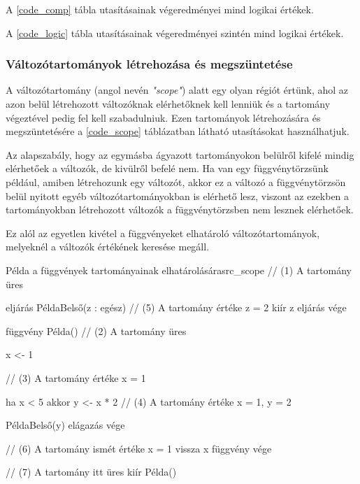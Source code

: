 A \ref{code_comp} tábla utasításainak végeredményei mind logikai értékek.


A \ref{code_logic} tábla utasításainak végeredményei szintén mind logikai értékek.

\subsubsection{Változótartományok létrehozása és megszüntetése}
\label{sec:scope}

A változótartomány (angol nevén \textit{"scope"}) alatt egy olyan régiót értünk, ahol az azon belül létrehozott változóknak elérhetőknek kell lenniük és a tartomány végeztével pedig fel kell szabadulniuk. Ezen tartományok létrehozására és megszüntetésére a \ref{code_scope} táblázatban látható utasításokat használhatjuk. 


Az alapszabály, hogy az egymásba ágyazott tartományokon belülről kifelé mindig elérhetőek a változók, de kivülről befelé nem. Ha van egy függvénytörzsünk például, amiben létrehozunk egy változót, akkor ez a változó a függvénytörzsön belül nyitott egyéb változótartományokban is elérhető lesz, viszont az ezekben a tartományokban létrehozott változók a függvénytörzsben nem lesznek elérhetőek.

Ez alól az egyetlen kivétel a függvényeket elhatároló változótartományok, melyeknél a változók értékének keresése megáll.

\begin{code}{Példa a függvények tartományainak elhatárolására}{src_scope}
// (1) A tartomány üres

eljárás PéldaBelső(z : egész)
    // (5) A tartomány értéke {z = 2}
    kiír z
eljárás vége

függvény Példa()
    // (2) A tartomány üres

    x <- 1

    // (3) A tartomány értéke {x = 1}

    ha x < 5 akkor
        y <- x * 2
        // (4) A tartomány értéke {x = 1, y = 2}

        PéldaBelső(y)
    elágazás vége

    // (6) A tartomány ismét értéke {x = 1}
    vissza x
függvény vége

// (7) A tartomány itt üres
kiír Példa()
\end{code}

